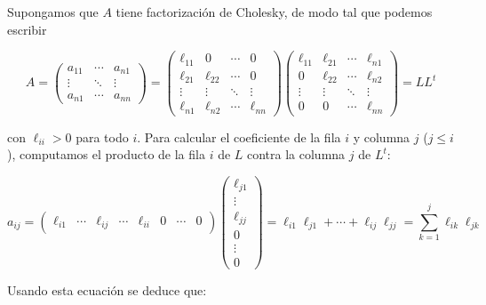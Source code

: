 Supongamos que $A$ tiene factorización de Cholesky, de modo tal que podemos escribir

\[
A = \begin{pmatrix}
a_{11} & \cdots & a_{n1} \\
\vdots & \ddots & \vdots \\
a_{n1} & \cdots & a_{nn}
\end{pmatrix} =
\begin{pmatrix}
\ell_{11} & 0 & \cdots & 0 \\
\ell_{21} & \ell_{22} & \cdots & 0 \\
\vdots & \vdots & \ddots & \vdots \\
\ell_{n1} & \ell_{n2} & \cdots & \ell_{nn}
\end{pmatrix}
\begin{pmatrix}
\ell_{11} 	& \ell_{21}	& \cdots & \ell_{n1} \\
0		 	& \ell_{22} 	& \cdots & \ell_{n2} \\
\vdots 		& \vdots 	& \ddots & \vdots \\
0		 	& 0			& \cdots & \ell_{nn}
\end{pmatrix} = LL^t
\]

con $\ell_{ii} > 0$ para todo $i$. Para calcular el coeficiente de la fila $i$ y columna $j$ ($j \leq i$), computamos el producto de la fila $i$ de $L$ contra la columna $j$ de $L^t$:

\[a_{ij} = \begin{pmatrix}
\ell_{i1} & \cdots & \ell_{ij} & \cdots & \ell_{ii} & 0 & \cdots & 0
\end{pmatrix}
\begin{pmatrix}
\ell_{j1} \\
\vdots \\
\ell_{jj} \\
0 \\
\vdots \\
0
\end{pmatrix} = \ell_{i1}\ell_{j1} + \cdots + \ell_{ij}\ell_{jj} = \sum_{k = 1}^j \ell_{ik}\ell_{jk}\]

Usando esta ecuación se deduce que:

